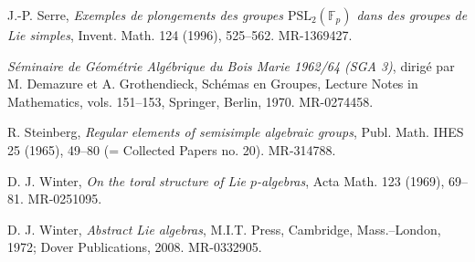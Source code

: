\documentclass[11pt]{article}
\begin{document}
\begin{description}[leftmargin=2.7cm,labelwidth=2.2cm,style=nextline]
\item[{[S4]}] J.-P. Serre, \emph{Exemples de plongements des groupes \(\mathrm{PSL}_2(\mathbb F_p)\) dans des groupes de Lie simples}, Invent. Math. 124 (1996), 525--562. MR-1369427.
\item[{[SGA3]}] \emph{Séminaire de Géométrie Algébrique du Bois Marie 1962/64 (SGA 3)}, dirigé par M. Demazure et A. Grothendieck, Schémas en Groupes, Lecture Notes in Mathematics, vols. 151--153, Springer, Berlin, 1970. MR-0274458.
\item[{[St]}] R. Steinberg, \emph{Regular elements of semisimple algebraic groups}, Publ. Math. IHES 25 (1965), 49--80 (= Collected Papers no. 20). MR-314788.
\item[{[W1]}] D. J. Winter, \emph{On the toral structure of Lie \(p\)-algebras}, Acta Math. 123 (1969), 69--81. MR-0251095.
\item[{[W2]}] D. J. Winter, \emph{Abstract Lie algebras}, M.I.T. Press, Cambridge, Mass.--London, 1972; Dover Publications, 2008. MR-0332905.
\end{description}
\end{document}
